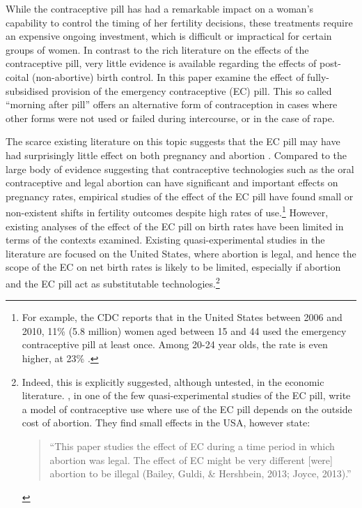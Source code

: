 While the contraceptive pill has had a remarkable impact on a woman's capability
to control the timing of her fertility decisions, these treatments require an
expensive ongoing investment, which is difficult or impractical for certain 
groups of women.  In contrast to the rich literature on the effects of the 
contraceptive pill, very little evidence is available regarding the effects of 
post-coital (non-abortive) birth control.  In this paper \person examine the 
effect of fully-subsidised provision of the emergency contraceptive (EC) pill.  
This so called ``morning after pill'' offers an alternative form of 
contraception in cases where other forms were not used or failed during 
intercourse, or in the case of rape.

The scarce existing literature on this topic suggests that the EC pill may have 
had surprisingly little effect on both pregnancy and abortion 
\citep{Grossetal2014,Durrance2013}. Compared to the large body of evidence 
suggesting that contraceptive technologies such as the oral contraceptive and 
legal abortion can have significant and important effects on pregnancy rates, 
empirical studies of the effect of the EC pill have found small or non-existent 
shifts in fertility outcomes despite high rates of use.\footnote{For example, 
the CDC reports that in the United States between 2006 and 2010, 11\% (5.8 
million) women aged between 15 and 44 used the emergency contraceptive pill at 
least once.  Among 20-24 year olds, the rate is even higher, at 23\% 
\citep{Danielsetal2013}.}  However, existing analyses of the effect of the 
EC pill on birth rates have been limited in terms of the contexts 
examined.  Existing quasi-experimental studies in the literature are focused on 
the United States, where abortion is legal, and hence the scope of the EC on 
net birth rates is likely to be limited, especially if abortion and the EC pill
act as substitutable technologies.\footnote{Indeed, this is explicitly 
suggested, although untested, in the economic literature. \citet{Grossetal2014}, 
in one of the few quasi-experimental studies of the EC pill, write a model of 
contraceptive use where use of the EC pill depends on the outside cost of 
abortion. They find small effects in the USA, however state:
     \begin{quote}
     ``This paper studies the effect of EC during a time period in which
     abortion was legal. The effect of EC might be very different [were]
     abortion to be illegal (Bailey, Guldi, \& Hershbein, 2013; Joyce,
     2013).''
     \end{quote}}

